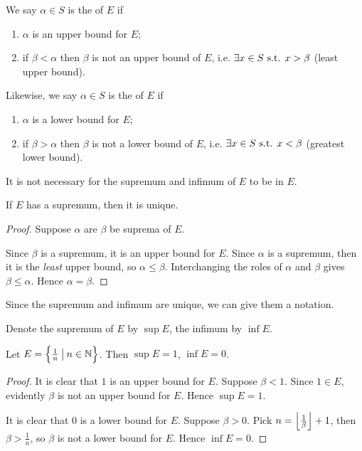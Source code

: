\begin{definition}
We say $\alpha\in S$ is the  of $E$ if
\begin{enumerate}[label=(\roman*)]
\item $\alpha$ is an upper bound for $E$;
\item if $\beta<\alpha$ then $\beta$ is not an upper bound of $E$, i.e. $\exists x\in S\text{ s.t. } x>\beta$ (least upper bound).
\end{enumerate}

Likewise, we say $\alpha\in S$ is the  of $E$ if 
\begin{enumerate}[label=(\roman*)]
\item $\alpha$ is a lower bound for $E$;
\item if $\beta>\alpha$ then $\beta$ is not a lower bound of $E$, i.e. $\exists x\in S\text{ s.t. } x<\beta$ (greatest lower bound).
\end{enumerate}
\end{definition}

\begin{remark}
It is not necessary for the supremum and infimum of $E$ to be in $E$.
\end{remark}

\begin{lemma}
If $E$ has a supremum, then it is unique.
\end{lemma}

\begin{proof}
Suppose $\alpha$ are $\beta$ be suprema of $E$.

Since $\beta$ is a supremum, it is an upper bound for $E$. Since $\alpha$ is a supremum, then it is the \emph{least} upper bound, so $\alpha\le\beta$. Interchanging the roles of $\alpha$ and $\beta$ gives $\beta\le\alpha$. Hence $\alpha=\beta$.
\end{proof}

Since the supremum and infimum are unique, we can give them a notation.

\begin{notation}
Denote the supremum of $E$ by $\sup E$, the infimum by $\inf E$.
\end{notation}

\begin{example}
Let $E=\left\{\frac{1}{n}\:\big|\:n\in\mathbb N\right\}$. Then $\sup E=1$, $\inf E=0$.
\begin{proof}
It is clear that $1$ is an upper bound for $E$. Suppose $\beta<1$. Since $1\in E$, evidently $\beta$ is not an upper bound for $E$. Hence $\sup E=1$.

It is clear that $0$ is a lower bound for $E$. Suppose $\beta>0$. Pick $n=\left\lfloor \frac{1}{\beta} \right\rfloor+1$, then $\beta>\frac{1}{n}$, so $\beta$ is not a lower bound for $E$. Hence $\inf E=0$.
\end{proof}
\end{example}

